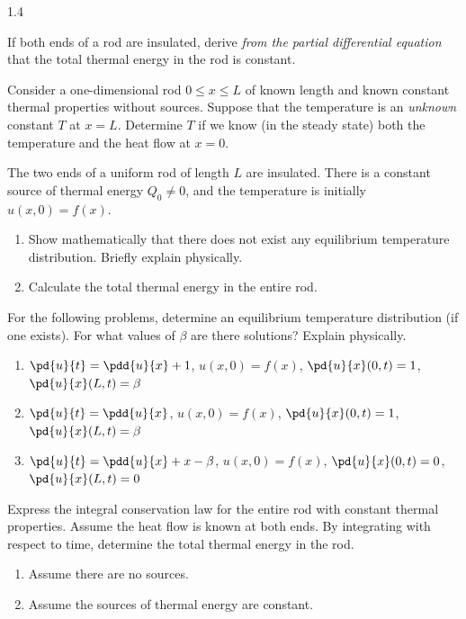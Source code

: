 \begin{exercises}{1.4}
\item If both ends of a rod are insulated, derive \emph{from the partial differential equation} that the total thermal energy in the rod is constant.

\item Consider a one-dimensional rod $0 \le x \le L$ of known length and known constant thermal properties without sources. Suppose that the temperature is an \emph{unknown} constant $T$ at $x = L$. Determine $T$ if we know (in the steady state) both the temperature and the heat flow at $x = 0$.

\item The two ends of a uniform rod of length $L$ are insulated. There is a constant source of thermal energy $Q_0 \neq 0$, and the temperature is initially $u(x,0) = f(x)$.
\begin{enumerate}
\item[(a)] Show mathematically that there does not exist any equilibrium temperature distribution. Briefly explain physically.
\item[(b)] Calculate the total thermal energy in the entire rod.
\end{enumerate}

\item For the following problems, determine an equilibrium temperature distribution (if one exists). For what values of $\beta$ are there solutions? Explain physically.
\begin{enumerate}
\item[\starred (a)] $\displaystyle\pd{u}{t} = \pdd{u}{x} + 1$, \quad $u(x,0) = f(x)$, \quad $\displaystyle\pd{u}{x}(0,t) = 1$, \quad $\displaystyle\pd{u}{x}(L,t) = \beta$
\item[(b)] $\displaystyle\pd{u}{t} = \pdd{u}{x}$, \quad $u(x,0) = f(x)$, \quad $\displaystyle\pd{u}{x}(0,t) = 1$, \quad $\displaystyle\pd{u}{x}(L,t) = \beta$
\item[(c)] $\displaystyle\pd{u}{t} = \pdd{u}{x} + x - \beta$, \quad $u(x,0) = f(x)$, \quad $\displaystyle\pd{u}{x}(0,t) = 0$, \quad $\displaystyle\pd{u}{x}(L,t) = 0$
\end{enumerate}

\item Express the integral conservation law for the entire rod with constant thermal properties. Assume the heat flow is known at both ends. By integrating with respect to time, determine the total thermal energy in the rod.
\begin{enumerate}
\item[(a)] Assume there are no sources.
\item[(b)] Assume the sources of thermal energy are constant.
\end{enumerate}


\end{exercises}
